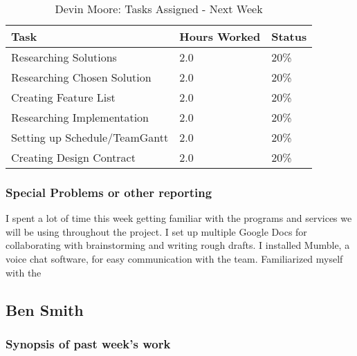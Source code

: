 \documentclass[12pt,article,compsoc]{IEEEtran}
\begin{document}
	\begin{table}[ht]
	\renewcommand{\arraystretch}{1.3}
		\caption{Devin Moore: Tasks Assigned - Next Week}
		
		\label{Summary of Devin Moore's activites: this week}
		
		\centering
		\begin{tabular}{p{5.5cm}|p{1cm}|p{1cm}}

		\hline
		\bfseries 	Task		 		& \bfseries Hours Worked	& \bfseries Status	\\
		\hline\hline
					Researching Solutions			& 2.0						& 20\%				\\	%
					Researching Chosen Solution		& 2.0						& 20\%			\\
					Creating Feature List		 	& 2.0						& 20\%			\\
					Researching Implementation		& 2.0						& 20\%			\\
					Setting up Schedule/TeamGantt	& 2.0						& 20\%			\\
					Creating Design Contract		& 2.0						& 20\%			\\	
		\hline
		\end{tabular}
	\end{table}

	\subsubsection*{Special Problems or other reporting}
	I spent a lot of time this week getting familiar with the programs and services we will be using throughout the project. I set up multiple Google Docs for collaborating with brainstorming and writing rough drafts. I installed Mumble, a voice chat software, for easy communication with the team. Familiarized myself with the
	\clearpage

\subsection{Ben Smith}

	\subsubsection*{Synopsis of past week's work}
\end{document}
